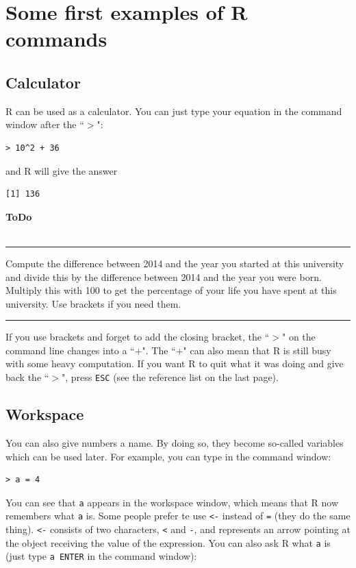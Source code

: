 \documentclass[a4paper,11pt,twocolumn,tablecaptionabove]{scrartcl}
\makeatletter
\newenvironment{ToDo} {%
  \begin{flushright}
    \hfill
    \begin{minipage}{0.95\columnwidth}         %
    \textsf{\textbf{ToDo}} \\
      \vspace{-0.85cm}\\
      {\color{Gray}\rule[-0.1cm]{\columnwidth}{1.5pt}}} { %
      {\color{Gray} \rule[0.3cm]{\columnwidth}{1.5pt}}
    \end{minipage}
    \vspace{1em}
  \end{flushright}
  }
\let\SF@@footnote\footnote
\def\footnote{\ifx\protect\@typeset@protect
 \expandafter\SF@@footnote
 \else
 \expandafter\SF@gobble@opt
 \fi
}
\edef\SF@gobble@opt{\noexpand\protect
 \expandafter\noexpand\csname SF@gobble@opt \endcsname}
\makeatother
\begin{document}
\section{Some first examples of R commands}

\subsection{Calculator}

R can be used as a calculator. You can just type your equation in the command window after the ``$>$":
\begin{Verbatim}[frame=single,gobble=0]
> 10^2 + 36
\end{Verbatim}
and R will give the answer
\begin{Verbatim}[frame=single,gobble=0]
[1] 136
\end{Verbatim}

\begin{ToDo}
Compute the difference between 2014 and the year you started at this university and divide this by the difference between 2014 and the year you were born. Multiply this with 100 to get the percentage of your life you have spent at this university. Use brackets if you need them. \\
\end{ToDo}

If you use brackets and forget to add the closing bracket, the ``$>$" on the command line changes into a ``+". The ``+" can also mean that R is still busy with some  heavy computation. If you want R to quit what it was doing and give back the ``$>$", press \texttt{ESC} (see the reference list on the last page). 

\subsection{Workspace}

You can also give numbers a name. By doing so, they become so-called variables which can be used later. For example, you can type in the command window: 
\begin{Verbatim}[frame=single,gobble=0]
> a = 4
\end{Verbatim}
You can see that \texttt{a} appears in the workspace window, which means that R now remembers what \texttt{a} is.\footnote{Some people prefer te use \texttt{<-} instead of \texttt{=} (they do the same thing). \texttt{<-} consists of two characters, \texttt{<} and \texttt{-}, and represents an arrow pointing at the object receiving the value of the expression.} You can also ask R what \texttt{a} is (just type \texttt{a ENTER} in the command window):
\end{document}
